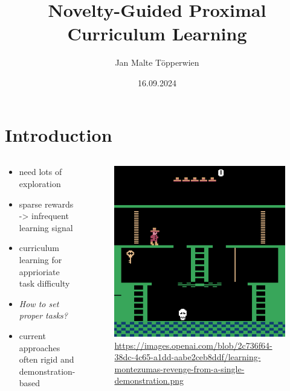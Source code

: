\documentclass[aspectratio=169]{beamer}
\title{Novelty-Guided Proximal Curriculum Learning}
\author{Jan Malte Töpperwien}
\date{16.09.2024}
\begin{document}
\begin{frame}
  \titlepage
\end{frame}

\section{Introduction}
\begin{frame}
  \begin{columns}[]
    \begin{column}{0.48\textwidth}
      \begin{itemize}
        \item need lots of exploration
        \item sparse rewards -> infrequent learning signal
        \item curriculum learning for apprioriate task difficulty
        \item<2> \textit{How to set proper tasks?}
        \item<2> current approaches often rigid and demonstration-based
      \end{itemize}
    \end{column}
    \hfill
    \begin{column}{0.48\textwidth}
      \begin{figure}
        \includegraphics[width=\textwidth, height=\textheight, keepaspectratio]{./images/learning-montezumas-revenge-from-a-single-demonstration}
        \caption{\tiny\url{https://images.openai.com/blob/2c736f64-38dc-4c65-a1dd-aabe2ceb8ddf/learning-montezumas-revenge-from-a-single-demonstration.png}}
      \end{figure}
    \end{column}
  \end{columns}
\end{frame}
\end{document}
